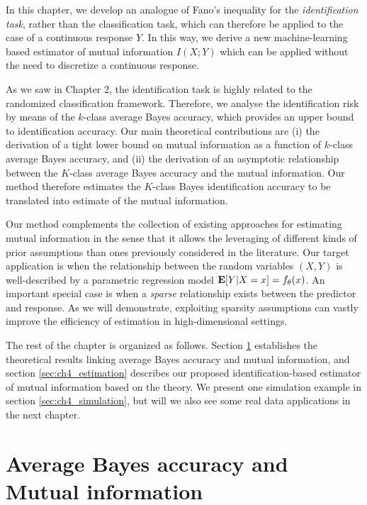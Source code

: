 In this chapter, we develop an analogue of Fano's inequality for the
\emph{identification task}, rather than the classification task, which
can therefore be applied to the case of a continuous response $Y$.  In
this way, we derive a new machine-learning based estimator of mutual
information $I(X; Y)$ which can be applied without the need to
discretize a continuous response.

As we saw in Chapter 2, the identification task is highly related to
the randomized classification framework.  Therefore, we analyse the
identification risk by means of the $k$-class average Bayes accuracy,
which provides an upper bound to identification accuracy.  Our main
theoretical contributions are (i) the derivation of a tight lower
bound on mutual information as a function of $k$-class average Bayes
accuracy, and (ii) the derivation of an asymptotic relationship
between the $K$-class average Bayes accuracy and the mutual
information. Our method therefore estimates the $K$-class Bayes
identification accuracy to be translated into estimate of the mutual
information.

Our method complements the collection of existing approaches for
estimating mutual information in the sense that it allows the
leveraging of different kinds of prior assumptions than ones
previously considered in the literature.  Our target application is
when the relationship between the random variables $(X, Y)$ is
well-described by a parametric regression model $\textbf{E}[Y|X=x] =
f_\theta(x)$.  An important special case is when a \emph{sparse}
relationship exists between the predictor and response.  As we will
demonstrate, exploiting sparsity assumptions can vastly improve the
efficiency of estimation in high-dimensional settings.

The rest of the chapter is organized as follows.  Section
\ref{sec:ch4_theory} establishes the theoretical results linking
average Bayes accuracy and mutual information, and section
\ref{sec:ch4_estimation} describes our proposed identification-based
estimator of mutual information based on the theory.  We present one
simulation example in section \ref{sec:ch4_simulation}, but will we
also see some real data applications in the next chapter.

\section{Average Bayes accuracy and Mutual information}\label{sec:ch4_theory}

